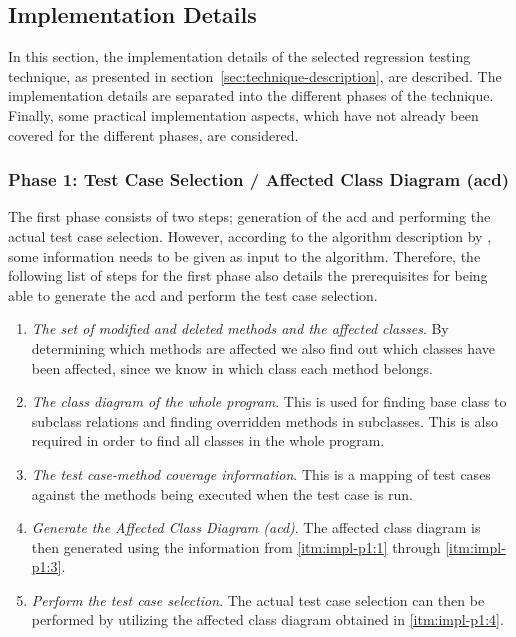 \documentclass[a4paper,english,12pt]{report}
\begin{document}
\subsection{Implementation Details}\label{sec:implementation-details}
In this section, the implementation details of the selected regression testing technique, as presented in section~\ref{sec:technique-description}, are described. The implementation details are separated into the different phases of the technique. Finally, some practical implementation aspects, which have not already been covered for the different phases, are considered.

\subsubsection{Phase 1: Test Case Selection / Affected Class Diagram (\gls{acd})}\label{sec:impl-p1}
The first phase consists of two steps; generation of the \gls{acd} and performing the actual test case selection. However, according to the algorithm description by \citet{mansour2009regression}, some information needs to be given as input to the algorithm. 
Therefore, the following list of steps for the first phase also details the prerequisites for being able to generate the \gls{acd} and perform the test case selection.

\begin{enumerate}[label=P1.\arabic*]
  \item\label{itm:impl-p1:1}\textit{The set of modified and deleted methods and the affected classes}. By determining which methods are affected we also find out which classes have been affected, since we know in which class each method belongs.
  \item\label{itm:impl-p1:2}\textit{The class diagram of the whole program}. This is used for finding base class to subclass relations and finding overridden methods in subclasses. This is also required in order to find all classes in the whole program.
  \item\label{itm:impl-p1:3}\textit{The test case-method coverage information}. This is a mapping of test cases against the methods being executed when the test case is run.
  \item\label{itm:impl-p1:4}\textit{Generate the Affected Class Diagram (\gls{acd})}. The affected class diagram is then generated using the information from \ref{itm:impl-p1:1} through \ref{itm:impl-p1:3}.
  \item\label{itm:impl-p1:5}\textit{Perform the test case selection}. The actual test case selection can then be performed by utilizing the affected class diagram obtained in \ref{itm:impl-p1:4}.
\end{enumerate}
\end{document}
